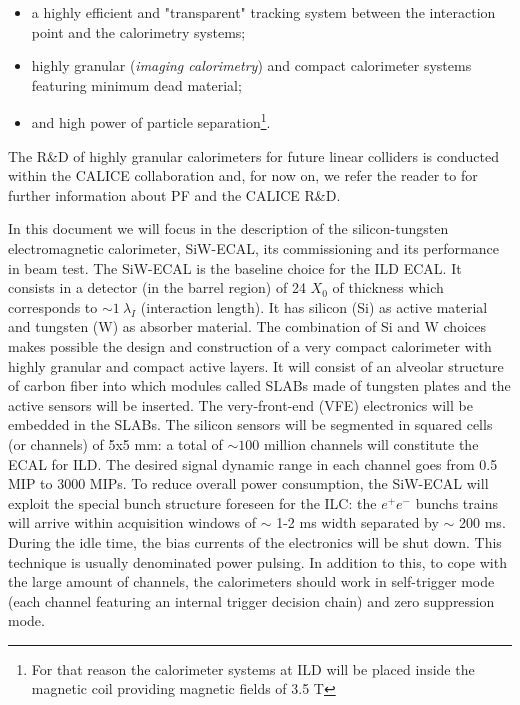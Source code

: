 \documentclass[a4paper,11pt]{article}
\begin{document}
\begin{itemize}
\item a highly efficient and "transparent" tracking system between the interaction point and the calorimetry systems;
\item highly granular ({\it imaging calorimetry}) and compact calorimeter systems featuring minimum dead material;
\item and high power of particle separation\footnote{
For that reason the calorimeter systems at ILD will be placed inside the magnetic coil
providing magnetic fields of 3.5 T}.
\end{itemize}

The R\&D of highly granular calorimeters for future linear colliders is conducted within the CALICE collaboration and, for now on, we refer the reader to \cite{Sefkow:2015hna} for further information about PF and the CALICE R\&D.

In this document we will focus in the description of the silicon-tungsten electromagnetic calorimeter,
SiW-ECAL, its commissioning and its performance in beam test.
The SiW-ECAL is the baseline choice for the ILD ECAL. It consists in a detector (in the barrel region) of 24 $X_{0}$ of thickness which corresponds to $\sim 1~\lambda_{I}$ (interaction length).
It has silicon (Si) as active material and tungsten (W) as absorber material.
The combination of Si and W choices  makes possible the design and construction
of a very compact calorimeter with highly granular and compact active layers.
It will consist of an alveolar structure of carbon fiber into which modules called SLABs made of tungsten
plates and the active sensors will be inserted. The very-front-end (VFE) electronics will be
embedded in the SLABs. The silicon sensors will be segmented
in squared cells (or channels) of 5x5 mm: a total of $\sim 100$ million channels will constitute the ECAL for ILD.
The desired signal dynamic range in each channel goes from 0.5 MIP to 3000 MIPs.
To reduce overall power consumption, the SiW-ECAL will exploit the special bunch structure
foreseen for the ILC: the $e^{+}e^{-}$ bunchs trains will arrive within
acquisition windows of $\sim$ 1-2 ms width separated by $\sim$ 200 ms. During the idle time, the bias currents of the electronics will be shut down.
This technique is usually denominated power pulsing. In addition to this, to cope with the large amount of channels, the calorimeters should work in self-trigger mode (each channel featuring an internal trigger decision chain) and zero suppression mode. 
\end{document}
